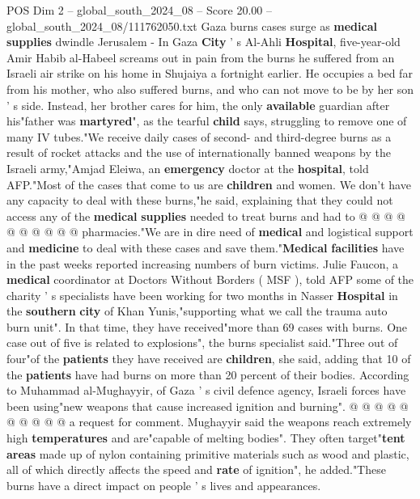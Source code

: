 \begin{textsample}{POS Dim 2 – global\_south\_2024\_08 – Score 20.00 – global\_south\_2024\_08/111762050.txt}  \label{ex:f2_pos_338}
Gaza burns cases surge as \textbf{medical} \textbf{supplies} dwindle Jerusalem - In Gaza \textbf{City} ' s Al-Ahli \textbf{Hospital}, five-year-old Amir Habib al-Habeel screams out in pain from the burns he suffered from an Israeli air strike on his home in Shujaiya a fortnight earlier.
He occupies a bed far from his mother, who also suffered burns, and who can not move to be by her son ' s side.
Instead, her brother cares for him, the only \textbf{available} guardian after his"father was \textbf{martyred}", as the tearful \textbf{child} says, struggling to remove one of many IV tubes."We receive daily cases of second- and third-degree burns as a result of rocket attacks and the use of internationally banned weapons by the Israeli army,"Amjad Eleiwa, an \textbf{emergency} doctor at the \textbf{hospital}, told AFP."Most of the cases that come to us are \textbf{children} and women.
We don't have any capacity to deal with these burns,"he said, explaining that they could not access any of the \textbf{medical} \textbf{supplies} needed to treat burns and had to @ @ @ @ @ @ @ @ @ @ pharmacies."We are in dire need of \textbf{medical} and logistical support and \textbf{medicine} to deal with these cases and save them."\textbf{Medical} \textbf{facilities} have in the past weeks reported increasing numbers of burn victims.
Julie Faucon, a \textbf{medical} coordinator at Doctors Without Borders ( MSF ), told AFP some of the charity ' s specialists have been working for two months in Nasser \textbf{Hospital} in the \textbf{southern} \textbf{city} of Khan Yunis,"supporting what we call the trauma auto burn unit".
In that time, they have received"more than 69 cases with burns.
One case out of five is related to explosions", the burns specialist said."Three out of four"of the \textbf{patients} they have received are \textbf{children}, she said, adding that 10 of the \textbf{patients} have had burns on more than 20 percent of their bodies.
According to Muhammad al-Mughayyir, of Gaza ' s civil defence agency, Israeli forces have been using"new weapons that cause increased ignition and burning". @ @ @ @ @ @ @ @ @ @ a request for comment.
Mughayyir said the weapons reach extremely high \textbf{temperatures} and are"capable of melting bodies".
They often target"\textbf{tent} \textbf{areas} made up of nylon containing primitive materials such as wood and plastic, all of which directly affects the speed and \textbf{rate} of ignition", he added."These burns have a direct impact on people ' s lives and appearances.

\end{textsample}
